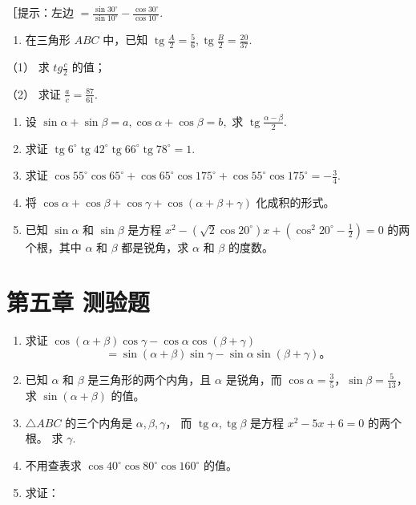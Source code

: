 ［提示：左边
\(= \frac{\sin 30^{\circ}}{\sin 10^{\circ}} -\frac{\cos 30^{\circ}}{\cos 10^{\circ}}.\)

\begin{enumerate}[start=6]
\item
  在三角形 \(ABC\) 中，已知
  \(\operatorname{tg} \frac{A}{2} = \frac{5}{6}, \operatorname{tg} \frac{B}{2} = \frac{20}{37}\).
\end{enumerate}

（1） 求 \(tg \frac{c}{2}\) 的值；

（2） 求证 \(\frac{a}{c} = \frac{87}{61}\).

\begin{enumerate}[start=7]
\item
  设 \(\sin \alpha + \sin \beta = a, \cos \alpha + \cos \beta = b,\) 求
  \(\operatorname{tg} \frac{\alpha - \beta}{2}\).
\item
  求证
  \(\operatorname{tg} 6^{\circ} \operatorname{tg} 42^{\circ} \operatorname{tg} 66^{\circ} \operatorname{tg} 78^{\circ} = 1\).
\item
  求证
  \(\cos 55^{\circ} \cos 65^{\circ} + \cos 65^{\circ} \cos 175^{\circ} + \cos 55^{\circ} \cos 175^{\circ} = -\frac{3}{4}\).
\item
  将
  \(\cos \alpha + \cos \beta + \cos \gamma + \cos (\alpha + \beta + \gamma)\)
  化成积的形式。
\item
  已知 \(\sin \alpha\) 和 \(\sin \beta\) 是方程
  \(x^{2} - (\sqrt{2} \cos 20^{\circ})x + \left(\cos^{2} 20^{\circ} - \frac{1}{2}\right) = 0\)
  的两个根，其中 \(\alpha\) 和 \(\beta\) 都是锐角，求 \(\alpha\) 和
  \(\beta\) 的度数。
\end{enumerate}

\section{第五章 测验题}

\begin{enumerate}
\item
  求证
  \(\cos (\alpha + \beta)\cos \gamma - \cos \alpha \cos (\beta + \gamma)\)
\[
= \sin (\alpha + \beta) \sin \gamma - \sin \alpha \sin (\beta + \gamma)\text{。}
\]
\item
  已知 \(\alpha\) 和 \(\beta\) 是三角形的两个内角，且 \(\alpha\)
  是锐角，而
  \(\cos \alpha = \frac{3}{5}\)，\(\sin \beta = \frac{5}{13}\)，求
  \(\sin (\alpha + \beta)\) 的值。
\item
  \(\triangle ABC\) 的三个内角是 \(\alpha, \beta, \gamma\)， 而
  \(\operatorname{tg} \alpha, \operatorname{tg} \beta\) 是方程
  \(x^{2} - 5x + 6 = 0\) 的两个根。 求 \(\gamma\).
\item
  不用查表求 \(\cos 40^{\circ} \cos 80^{\circ} \cos 160^{\circ}\) 的值。
\item
  求证：
\end{enumerate}

